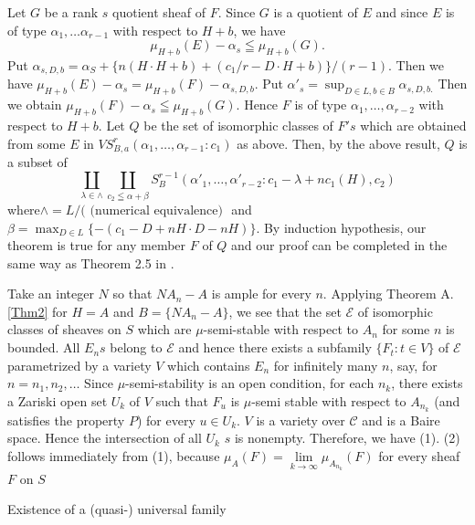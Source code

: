 \begin{Proof}
Let $G$ be a rank $s$ quotient sheaf of $F$. Since $G$ is a quotient of
$E$ and since $E$ is of type $\alpha_1,\ldots \alpha_{r-1}$ with
respect to $H+b$, we have 
$$
\mu_{H+b}(E)-\alpha_s\leqq \mu_{H+b}(G).
$$
Put $\alpha_{s,D,b}=\alpha_S+\{n(H\cdot H+b)+(c_1/r-D\cdot
H+b)\}/(r-1)$. Then we have
$\mu_{H+b}(E)-\alpha_s=\mu_{H+b}(F)-\alpha_{s,D,b}$. Put
$\alpha'_s=\displaystyle\mathop{\sup}_{D\in L, b\in B} \alpha_{s,D,b.}$
Then we obtain $\mu_{H+b}(F)-\alpha_s\leqq \mu_{H+b}(G)$. Hence $F$ is
of type $\alpha_1,\ldots,\alpha_{r-2}$ with respect to $H+b$. Let $Q$
be the set of isomorphic classes of $F's$ which are obtained from some
$E$ in $VS^{r}_{B,a}(\alpha_1,\ldots,\alpha_{r-1}:c_1)$ as
above. Then, by the above result, $Q$ is a subset of 
$$
\coprod\limits_{\lambda \in \wedge}\coprod\limits_{c_2\leqq \alpha+\beta}S^{r-1}_B\left(\alpha'_1,\ldots, \alpha'_{r-2}:c_1-\lambda+nc_1(H),c_2\right)
$$
where\pageoriginale $\wedge=L/(\text{ (numerical equivalence) }$ and
$\beta=\displaystyle\mathop{\max}_{D\in L}\{-(c_1-D+nH\cdot
D-nH)\}$. By induction hypothesis, our theorem is true for any member
$F$ of $Q$ and our proof can be completed in the same way as
Theorem 2.5 in \cite{key8}.
\enprf
\end{Proof}


\begin{pf4}
Take an integer $N$ so that $NA_n-A$ is ample for every $n$. Applying
Theorem A.\ref{Thm2} for $H=A$ and $B=\{NA_n-A\}$, we see that the set
$\mathscr{E}$ of isomorphic classes of sheaves on $S$ which are
$\mu$-semi-stable with respect to $A_n$ for some $n$ is bounded. All
$E_n s$ belong to $\mathscr{E}$ and hence there exists a subfamily
$\{F_t:t\in V\}$ of $\mathscr{E}$ parametrized by a variety $V$ which
contains $E_n$ for infinitely many $n$, say, for $n=n_1,n_2,\ldots$
Since $\mu$-semi-stability is an open condition, for each $n_k$, there
exists a Zariski open set $U_k$ of $V$ such that $F_u$ is $\mu$-semi
stable with respect to $A_{n_{k}}$ (and satisfies the property $P$)
for every $u\in U_k$. $V$ is a variety over $\mathscr{C}$ and is a
Baire space. Hence the intersection of all $U_k$ $s$ is
nonempty. Therefore, we have (1). (2) follows immediately from (1),
because $\mu_A(F)=\lim\limits_{k\to \infty}\mu_{A_{n_{k}}}(F)$ for every
sheaf $F$ on $S$
\enprf
\end{pf4}

\begin{app}
Existence of a (quasi-) universal family 
\end{app}

